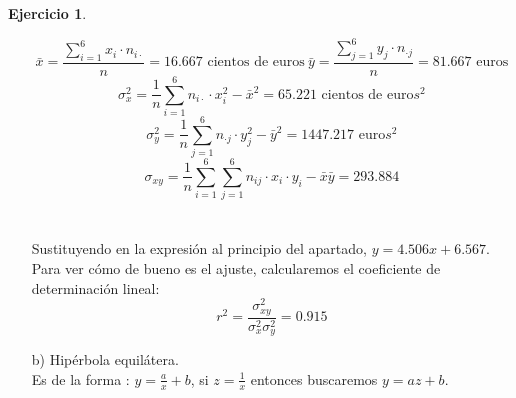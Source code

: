 \documentclass[a4paper, 12pt]{article}
\theoremstyle{definition}
\newtheorem{ej}{Ejercicio}
\begin{document}
\begin{ej}
\begin{enumerate}
    $$\bar{x} = \frac{\displaystyle\sum_{i=1}^6 x_i \cdot n_{i \cdot}}{n} = 16.667 \text{ cientos de euros} \ \bar{y} = \frac{\displaystyle\sum_{j=1}^6 y_j \cdot n_{\cdot j}}{n} = 81.667 \text{ euros}$$
    $$\sigma_x^2 = \frac{1}{n} \displaystyle \sum_{i = 1}^6 n_{i \cdot} \cdot x_i^2 - \bar{x}^2 = 65.221 \text{ cientos de euro} s^2$$
    $$\sigma_y^2 = \frac{1}{n} \displaystyle \sum_{j = 1}^6 n_{\cdot j} \cdot y_j^2 - \bar{y}^2 = 1447.217 \text{ euro} s^2$$
    $$\sigma_{xy} = \frac{1}{n}   \displaystyle \sum_{i = 1}^6 \sum_{j=1}^6 n_{ij} \cdot x_i \cdot y_i - \bar{x} \bar{y} = 293.884$$
    \\
    \\
    Sustituyendo en la expresión al principio del apartado, $y = 4.506x + 6.567$.
    \\
    Para ver cómo de bueno es el ajuste, calcularemos el coeficiente de determinación lineal:
    $$ r^2 = \dfrac{\sigma_{xy}^2}{\sigma_x^2 \sigma_y^2} = 0.915$$
    \item[b) ] Hipérbola equilátera.
    \\
    Es de la forma : $y = \frac{a}{x} + b$, si $z = \frac{1}{x}$ entonces buscaremos $y = az + b$. \\
    

\end{enumerate}
\end{ej}
\end{document}

